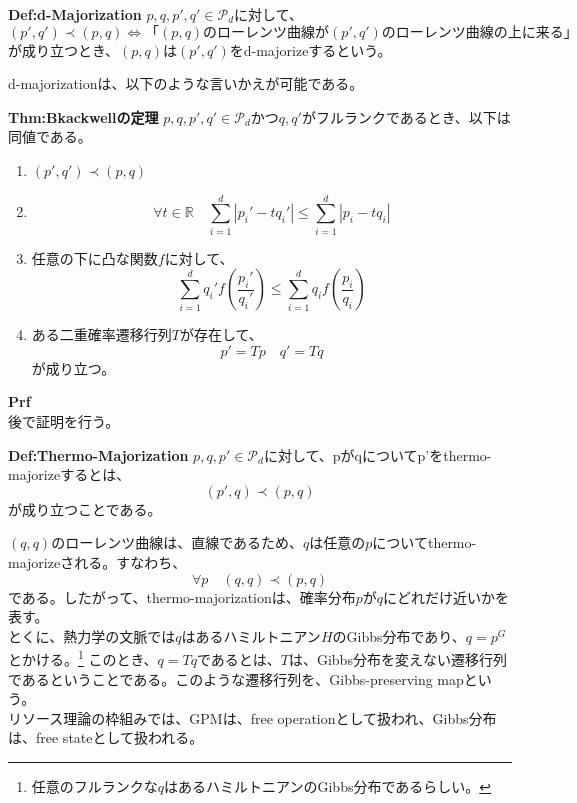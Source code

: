 \documentclass[a4paper,11pt]{jsarticle}
\numberwithin{equation}{section}
\begin{document}
\begin{itembox}[l]{\textbf{Def:d-Majorization}}
    $p,q,p',q' \in \mathcal{P}_d$に対して、
    \begin{equation}
        (p',q') \prec (p,q) \Leftrightarrow 「(p,q) \text{のローレンツ曲線が}(p',q') \text{のローレンツ曲線の上に来る」}
    \end{equation}
    が成り立つとき、$(p,q)$は$(p',q')$をd-majorizeするという。
\end{itembox}
d-majorizationは、以下のような言いかえが可能である。\\
\begin{itembox}[l]{\textbf{Thm:Bkackwellの定理}}
    $p,q,p',q' \in \mathcal{P}_d$かつ$q,q'$がフルランクであるとき、以下は同値である。
    \begin{enumerate}
        \item $(p',q') \prec (p,q)$
        \item 
        \begin{equation}
            \forall t \in \mathbb{R} \quad \sum_{i=1}^{d}|p_i'-tq_i'| \leq \sum_{i=1}^{d}|p_i-tq_i|
        \end{equation}
        \item 任意の下に凸な関数$f$に対して、
        \begin{equation}
            \sum_{i=1}^{d} q_i'f(\frac{p_i'}{q_i'}) \leq \sum_{i=1}^{d} q_i f(\frac{p_i}{q_i})
        \end{equation}
        \item ある二重確率遷移行列$T$が存在して、
        \begin{equation}
            p' = Tp \quad q' = Tq
        \end{equation}
        が成り立つ。
    \end{enumerate}
\end{itembox}
\textbf{Prf}\\
後で証明を行う。\\


\begin{itembox}[l]{\textbf{Def:Thermo-Majorization}}
    $p,q,p' \in \mathcal{P}_d$に対して、pがqについてp'をthermo-majorizeするとは、
    \begin{equation}
        (p',q) \prec (p,q)
    \end{equation}
    が成り立つことである。
\end{itembox}
$(q,q)$のローレンツ曲線は、直線であるため、$q$は任意の$p$についてthermo-majorizeされる。すなわち、
\begin{equation}
    \forall p \quad (q,q) \prec (p,q)
\end{equation}
である。したがって、thermo-majorizationは、確率分布$p$が$q$にどれだけ近いかを表す。\\
とくに、熱力学の文脈では$q$はあるハミルトニアン$H$のGibbs分布であり、$q=p^G$とかける。\footnote{任意のフルランクな$q$はあるハミルトニアンのGibbs分布であるらしい。}
このとき、$q=Tq$であるとは、$T$は、Gibbs分布を変えない遷移行列であるということである。このような遷移行列を、Gibbs-preserving mapという。\\
リソース理論の枠組みでは、GPMは、free operationとして扱われ、Gibbs分布は、free stateとして扱われる。\\
\end{document}
